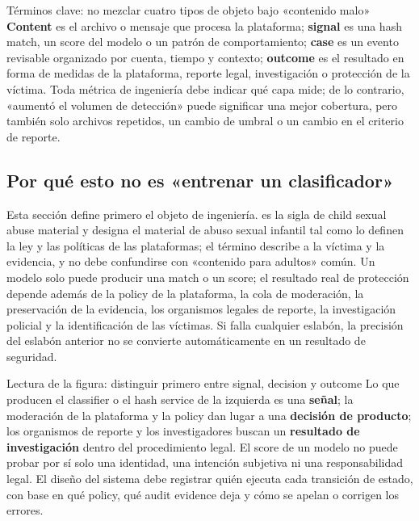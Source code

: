 \begin{knowledgebox}{Términos clave: no mezclar cuatro tipos de objeto bajo «contenido malo»}
\textbf{Content} es el archivo o mensaje que procesa la plataforma; \textbf{signal} es una hash match, un score del modelo o un patrón de comportamiento; \textbf{case} es un evento revisable organizado por cuenta, tiempo y contexto; \textbf{outcome} es el resultado en forma de medidas de la plataforma, reporte legal, investigación o protección de la víctima. Toda métrica de ingeniería debe indicar qué capa mide; de lo contrario, «aumentó el volumen de detección» puede significar una mejor cobertura, pero también solo archivos repetidos, un cambio de umbral o un cambio en el criterio de reporte.
\end{knowledgebox}

\subsection{Por qué esto no es «entrenar un clasificador»}

Esta sección define primero el objeto de ingeniería.  es la sigla de child sexual abuse material y designa el material de abuso sexual infantil tal como lo definen la ley y las políticas de las plataformas; el término describe a la víctima y la evidencia, y no debe confundirse con «contenido para adultos» común. Un modelo solo puede producir una match o un score; el resultado real de protección depende además de la policy de la plataforma, la cola de moderación, la preservación de la evidencia, los organismos legales de reporte, la investigación policial y la identificación de las víctimas. Si falla cualquier eslabón, la precisión del eslabón anterior no se convierte automáticamente en un resultado de seguridad.


\begin{knowledgebox}{Lectura de la figura: distinguir primero entre signal, decision y outcome}
Lo que producen el classifier o el hash service de la izquierda es una \textbf{señal}; la moderación de la plataforma y la policy dan lugar a una \textbf{decisión de producto}; los organismos de reporte y los investigadores buscan un \textbf{resultado de investigación} dentro del procedimiento legal. El score de un modelo no puede probar por sí solo una identidad, una intención subjetiva ni una responsabilidad legal. El diseño del sistema debe registrar quién ejecuta cada transición de estado, con base en qué policy, qué audit evidence deja y cómo se apelan o corrigen los errores.
\end{knowledgebox}

